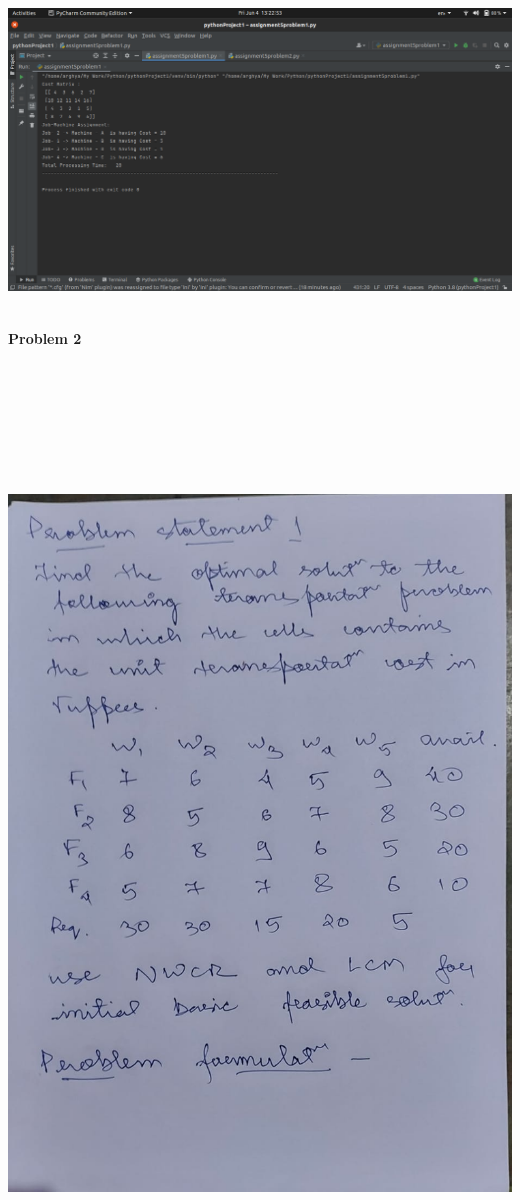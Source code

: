 \documentclass[12pt, letterpaper, twoside]{book}
\begin{document}
\includegraphics[width=550pt]{Output1}
\pagebreak

\begin{center}
\textbf{\\Problem 2}
\end{center}
\begin{flushleft}
\includegraphics[width=\paperwidth, height=10in]{Page1}
\end{flushleft}
\end{document}
